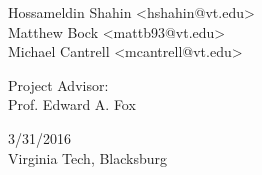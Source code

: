 \begin{titlepage}
\begin{center}
{    }
    \vspace{0.2cm}
    {\large
      Hossameldin Shahin <hshahin@vt.edu>\\
      Matthew Bock <mattb93@vt.edu>\\
      Michael Cantrell <mcantrell@vt.edu>\\
    }
  \end{center}
  \vfill
  \begin{center}
    {\Large
      Project Advisor:\\
    }
    \vspace{0.2cm}
    {\large
      Prof. Edward A. Fox\\
    }
  \end{center}
  \vfill
  \begin{center}
    {\Large
      3/31/2016\\
      Virginia Tech, Blacksburg\\
    }
  \end{center}
\end{titlepage}
\clearpage